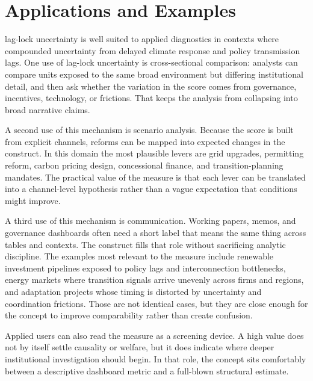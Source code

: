 \documentclass[12pt]{article}
\begin{document}
\section{Applications and Examples}
lag-lock uncertainty is well suited to applied diagnostics in contexts where compounded uncertainty from delayed climate response and policy transmission lags. One use of lag-lock uncertainty is cross-sectional comparison: analysts can compare units exposed to the same broad environment but differing institutional detail, and then ask whether the variation in the score comes from governance, incentives, technology, or frictions. That keeps the analysis from collapsing into broad narrative claims.

A second use of this mechanism is scenario analysis. Because the score is built from explicit channels, reforms can be mapped into expected changes in the construct. In this domain the most plausible levers are grid upgrades, permitting reform, carbon pricing design, concessional finance, and transition-planning mandates. The practical value of the measure is that each lever can be translated into a channel-level hypothesis rather than a vague expectation that conditions might improve.

A third use of this mechanism is communication. Working papers, memos, and governance dashboards often need a short label that means the same thing across tables and contexts. The construct fills that role without sacrificing analytic discipline. The examples most relevant to the measure include renewable investment pipelines exposed to policy lags and interconnection bottlenecks, energy markets where transition signals arrive unevenly across firms and regions, and adaptation projects whose timing is distorted by uncertainty and coordination frictions. Those are not identical cases, but they are close enough for the concept to improve comparability rather than create confusion.

Applied users can also read the measure as a screening device. A high value does not by itself settle causality or welfare, but it does indicate where deeper institutional investigation should begin. In that role, the concept sits comfortably between a descriptive dashboard metric and a full-blown structural estimate.
\end{document}
